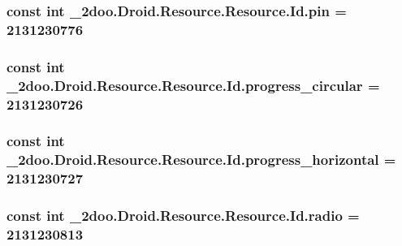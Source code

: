 \hypertarget{class__2doo_1_1_droid_1_1_resource_1_1_id_1359070e895088a8f65ee06e83923429}{
\subsubsection[{pin}]{\setlength{\rightskip}{0pt plus 5cm}const int \_\-2doo.Droid.Resource.Resource.Id.pin = 2131230776}}
\label{class__2doo_1_1_droid_1_1_resource_1_1_id_1359070e895088a8f65ee06e83923429}


\hypertarget{class__2doo_1_1_droid_1_1_resource_1_1_id_bf7950a3f81df8b68c2c8f715a1444af}{
\subsubsection[{progress\_\-circular}]{\setlength{\rightskip}{0pt plus 5cm}const int \_\-2doo.Droid.Resource.Resource.Id.progress\_\-circular = 2131230726}}
\label{class__2doo_1_1_droid_1_1_resource_1_1_id_bf7950a3f81df8b68c2c8f715a1444af}


\hypertarget{class__2doo_1_1_droid_1_1_resource_1_1_id_5007f0ef32103c7e1f21e4827812f4d7}{
\subsubsection[{progress\_\-horizontal}]{\setlength{\rightskip}{0pt plus 5cm}const int \_\-2doo.Droid.Resource.Resource.Id.progress\_\-horizontal = 2131230727}}
\label{class__2doo_1_1_droid_1_1_resource_1_1_id_5007f0ef32103c7e1f21e4827812f4d7}


\hypertarget{class__2doo_1_1_droid_1_1_resource_1_1_id_0520517a7f23a79ee81da23c60539d9c}{
\subsubsection[{radio}]{\setlength{\rightskip}{0pt plus 5cm}const int \_\-2doo.Droid.Resource.Resource.Id.radio = 2131230813}}
\label{class__2doo_1_1_droid_1_1_resource_1_1_id_0520517a7f23a79ee81da23c60539d9c}


